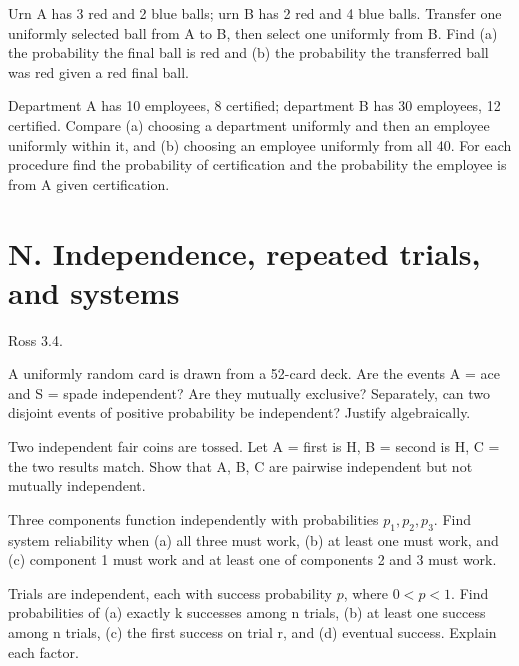 \documentclass[11pt]{article}
\newcommand{\qid}[1]{\par\needspace{5\baselineskip}\noindent{\color{accent}\bfseries #1}\quad}
\newcommand{\source}[1]{{\small\color{muted}#1}\par}
\begin{document}
\qid{M4} Urn A has 3 red and 2 blue balls; urn B has 2 red and 4 blue balls. Transfer one uniformly selected ball from A to B, then select one uniformly from B. Find (a) the probability the final ball is red and (b) the probability the transferred ball was red given a red final ball.
\par\vspace{0.40in}

\qid{M5} Department A has 10 employees, 8 certified; department B has 30 employees, 12 certified. Compare (a) choosing a department uniformly and then an employee uniformly within it, and (b) choosing an employee uniformly from all 40. For each procedure find the probability of certification and the probability the employee is from A given certification.
\par\vspace{0.40in}


\clearpage
\section*{N. Independence, repeated trials, and systems}
\source{Ross 3.4.}
\qid{N1} A uniformly random card is drawn from a 52-card deck. Are the events A = ace and S = spade independent? Are they mutually exclusive? Separately, can two disjoint events of positive probability be independent? Justify algebraically.
\par\vspace{0.40in}

\qid{N2} Two independent fair coins are tossed. Let A = first is H, B = second is H, C = the two results match. Show that A, B, C are pairwise independent but not mutually independent.
\par\vspace{0.40in}

\qid{N3} Three components function independently with probabilities \(p_1,p_2,p_3\). Find system reliability when (a) all three must work, (b) at least one must work, and (c) component 1 must work and at least one of components 2 and 3 must work.
\par\vspace{0.40in}

\qid{N4} Trials are independent, each with success probability \(p\), where \(0<p<1\). Find probabilities of (a) exactly k successes among n trials, (b) at least one success among n trials, (c) the first success on trial r, and (d) eventual success. Explain each factor.
\par\vspace{0.40in}
\end{document}
